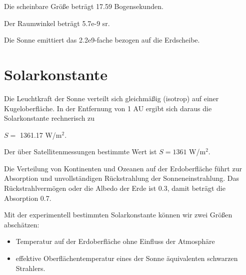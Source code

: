 \documentclass[
  a4paper,
  DIV=11]{scrreprt}
\newenvironment{Shaded}{\begin{snugshade}}{\end{snugshade}}
\newcommand{\ConstantTok}[1]{\textcolor[rgb]{0.56,0.35,0.01}{#1}}
\newcommand{\FloatTok}[1]{\textcolor[rgb]{0.68,0.00,0.00}{#1}}
\newcommand{\FunctionTok}[1]{\textcolor[rgb]{0.28,0.35,0.67}{#1}}
\newcommand{\NormalTok}[1]{\textcolor[rgb]{0.00,0.23,0.31}{#1}}
\newcommand{\OperatorTok}[1]{\textcolor[rgb]{0.37,0.37,0.37}{#1}}
\newcommand{\SpecialCharTok}[1]{\textcolor[rgb]{0.37,0.37,0.37}{#1}}
\newcommand{\StringTok}[1]{\textcolor[rgb]{0.13,0.47,0.30}{#1}}
\providecommand{\tightlist}{%
  \setlength{\itemsep}{0pt}\setlength{\parskip}{0pt}}\usepackage{longtable,booktabs,array}
\begin{document}
Die scheinbare Größe beträgt 17.59 Bogensekunden.

Der Raumwinkel beträgt 5.7e-9 sr.

Die Sonne emittiert das 2.2e9-fache bezogen auf die Erdscheibe.

\hypertarget{solarkonstante}{%
\section{Solarkonstante}\label{solarkonstante}}

\begin{Shaded}
\end{Shaded}

Die Leuchtkraft der Sonne verteilt sich gleichmäßig (isotrop) auf einer
Kugeloberfläche. In der Entfernung von 1 AU ergibt sich daraus die
Solarkonstante rechnerisch zu

\(S =\) 1361.17 W/m\(^2\).

Der über Satellitenmessungen bestimmte Wert ist \(S=1361\) W/m\(^{2}\).

Die Verteilung von Kontinenten und Ozeanen auf der Erdoberfläche führt
zur Absorption und unvollständigen Rückstrahlung der Sonneneinstrahlung.
Das Rückstrahlvermögen oder die Albedo der Erde ist 0.3, damit beträgt
die Absorption 0.7.

Mit der experimentell bestimmten Solarkonstante können wir zwei Größen
abschätzen:

\begin{itemize}
\tightlist
\item
  Temperatur auf der Erdoberfläche ohne Einfluss der Atmosphäre
\item
  effektive Oberflächentemperatur eines der Sonne äquivalenten schwarzen
  Strahlers.
\end{itemize}
\end{document}
